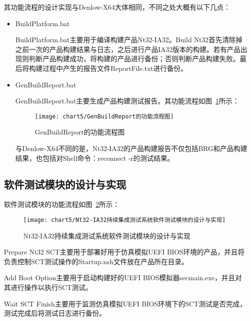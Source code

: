 		其功能流程的设计实现与Denlow-X64大体相同，不同之处大概有以下几点：
		\begin{itemize}
			\item BuildPlatform.bat
			
				BuildPlatform.bat主要用于编译构建产品Nt32-IA32。Build Nt32首先清除掉之前一次的产品构建结果与日志，之后进行产品IA32版本的构建。若有产品出现则判断产品构建成功，将构建的产品进行备份；否则判断产品构建失败。最后将构建过程中产生的报告文件ReportFile.txt进行备份。
			\item GenBuildReport.bat
			
				GenBuildReport.bat主要生成产品构建测试报告。其功能流程如图~\ref{fig:GenNt32BuildReport的功能流程图}所示：
				
				\begin{figure}[H] %
					\centering
					\texttt{[image: chart5/GenBuildReport的功能流程图]}
					\caption{GenBuildReport的功能流程图}
					\label{fig:GenNt32BuildReport的功能流程图}
				\end{figure}
				
				与Denlow-X64不同的是，Nt32-IA32的产品构建报告不仅包括BRG和产品构建结果，也包括对Shell命令：reconnect -r的测试结果。
		\end{itemize}
	
	\subsection{软件测试模块的设计与实现}
		
		软件测试模块的功能流程如图~\ref{fig:Nt32-IA32持续集成测试系统软件测试模块的设计与实现}所示：
		
		\begin{figure}[H] %
			\centering
			\texttt{[image: chart5/Nt32-IA32持续集成测试系统软件测试模块的设计与实现]}
			\caption{Nt32-IA32持续集成测试系统软件测试模块的设计与实现}
			\label{fig:Nt32-IA32持续集成测试系统软件测试模块的设计与实现}
		\end{figure}
		
		Prepare Nt32 SCT主要用于部署好用于仿真模拟UEFI BIOS环境的产品，并且将负责控制SCT测试操作的Startup.nsh文件放在产品所在目录。
		
		Add Boot Option主要用于启动构建好的UEFI BIOS模拟器secmain.exe，并且对其进行操作以执行SCT测试。
		
		Wait SCT Finish主要用于监测仿真模拟UEFI BIOS环境下的SCT测试是否完成，测试完成后将测试日志进行备份。
		
